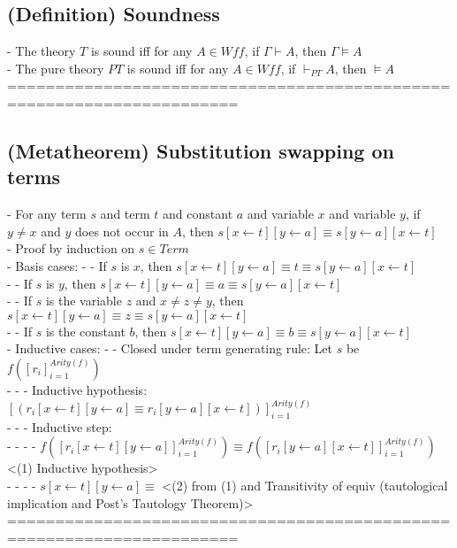 \documentclass{article}
\begin{document}
\subsection{(Definition) Soundness}
	- The theory $T$ is sound iff for any $A \in Wff$, if $\Gamma \vdash A$, then $\Gamma \vDash A$ \\
	- The pure theory $PT$ is sound iff for any $A \in Wff$, if $\vdash_{PT} A$, then $\vDash A$ \\
	======================================================================
\subsection{(Metatheorem) Substitution swapping on terms}
	- For any term $s$ and term $t$ and constant $a$ and variable $x$ and variable $y$, if $y \neq x$ and $y$ does not occur in $A$, then $s[x \leftarrow t][y \leftarrow a] \equiv s[y \leftarrow a][x \leftarrow t]$ \\
	- Proof by induction on $s \in Term$ \\
	- Basis cases:
		- - If $s$ is $x$, then $s[x \leftarrow t][y \leftarrow a] \equiv t \equiv s[y \leftarrow a][x \leftarrow t]$ \\
		- - If $s$ is $y$, then $s[x \leftarrow t][y \leftarrow a] \equiv a \equiv s[y \leftarrow a][x \leftarrow t]$ \\
		- - If $s$ is the variable $z$ and $x \neq z \neq y$, then $s[x \leftarrow t][y \leftarrow a] \equiv z \equiv s[y \leftarrow a][x \leftarrow t]$ \\
		- - If $s$ is the constant $b$, then $s[x \leftarrow t][y \leftarrow a] \equiv b \equiv s[y \leftarrow a][x \leftarrow t]$ \\
	- Inductive cases:
		- - Closed under term generating rule: Let $s$ be $f([r_i]_{i=1}^{Arity(f)})$ \\
			- - - Inductive hypothesis: $[(r_i[x \leftarrow t][y \leftarrow a] \equiv r_i[y \leftarrow a][x \leftarrow t])]_{i=1}^{Arity(f)}$ \\
			- - - Inductive step: \\
				- - - - $f([r_i[x \leftarrow t][y \leftarrow a]]_{i=1}^{Arity(f)}) \equiv f([r_i[y \leftarrow a][x \leftarrow t]]_{i=1}^{Arity(f)})$ <(1) Inductive hypothesis> \\
				- - - - $s[x \leftarrow t][y \leftarrow a] \equiv $ <(2) from (1) and Transitivity of equiv (tautological implication and Post's Tautology Theorem)> \\
	======================================================================
\end{document}
